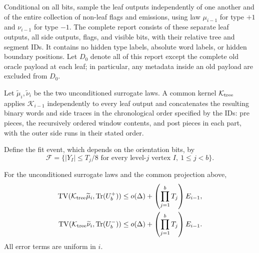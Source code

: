 Conditional on all bits, sample the leaf outputs independently of one another and of the entire collection of non-leaf flags and emissions, using law $\mu_{i-1}$ for type $+1$ and $\nu_{i-1}$ for type $-1$.  The complete report consists of these separate leaf outputs, all side outputs, flags, and visible bits, with their relative tree and segment IDs.  It contains no hidden type labels, absolute word labels, or hidden boundary positions.  Let $D_0$ denote all of this report except the complete old oracle payload at each leaf; in particular, any metadata inside an old payload are excluded from $D_0$.

Let $\widetilde\mu_i,\widetilde\nu_i$ be the two unconditioned surrogate laws.  A common kernel $\mathcal K_{\rm tree}$ applies $\mathcal K_{i-1}$ independently to every leaf output and concatenates the resulting binary words and side traces in the chronological order specified by the IDs: pre pieces, the recursively ordered window contents, and post pieces in each part, with the outer side runs in their stated order.

Define the fit event, which depends on the orientation bits, by
\begin{equation}\label{eq:fit_event}
 \mathcal F=\bigl\{|Y_I|\le T_j/8
       \text{ for every level-$j$ vertex }I,\ 1\le j<b\bigr\}.
\end{equation}

\begin{lemma}\label{lem:tree-simulation}
For the unconditioned surrogate laws and the common projection above,
\begin{equation}\label{eq:projection_tree}
\begin{aligned}
 \operatorname{TV}(\mathcal K_{\rm tree}\widetilde\mu_i,\mathrm{Tr}(U_b^+))
 &\le o(\Delta)+\left(\prod_{j=1}^bT_j\right)E_{i-1},\\
 \operatorname{TV}(\mathcal K_{\rm tree}\widetilde\nu_i,\mathrm{Tr}(U_b^-))
 &\le o(\Delta)+\left(\prod_{j=1}^bT_j\right)E_{i-1}.
\end{aligned}
\end{equation}
All error terms are uniform in $i$.
\end{lemma}

